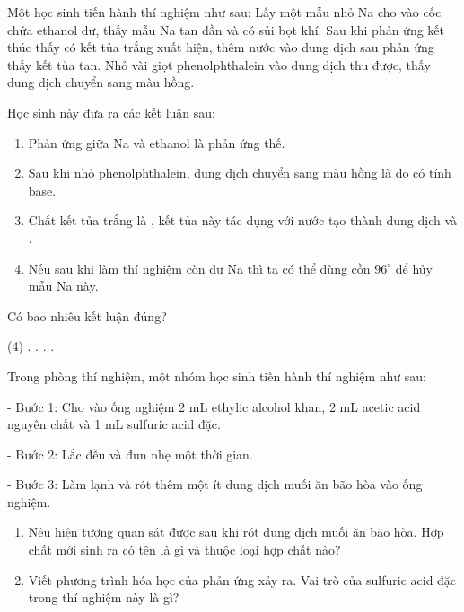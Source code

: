 \begin{tuluyen}
Một học sinh tiến hành thí nghiệm như sau: Lấy một mẫu nhỏ Na cho vào cốc chứa ethanol dư, thấy mẫu Na tan dần và có sủi bọt khí. Sau khi phản ứng kết thúc thấy có kết tủa trắng xuất hiện, thêm nước vào dung dịch sau phản ứng thấy kết tủa tan. Nhỏ vài giọt phenolphthalein vào dung dịch thu được, thấy dung dịch chuyển sang màu hồng.

Học sinh này đưa ra các kết luận sau:
\begin{enumerate}
\item Phản ứng giữa Na và ethanol là phản ứng thế.
\item Sau khi nhỏ phenolphthalein, dung dịch chuyển sang màu hồng là do  có tính base.
\item Chất kết tủa trắng là , kết tủa này tác dụng với nước tạo thành dung dịch  và .
\item Nếu sau khi làm thí nghiệm còn dư Na thì ta có thể dùng cồn $96^\circ$ để hủy mẫu Na này.
\end{enumerate}
Có bao nhiêu kết luận đúng?
\begin{tasks}(4)
.
.
.
.
\end{tasks}
\end{tuluyen}



\begin{tuluyen}
Trong phòng thí nghiệm, một nhóm học sinh tiến hành thí nghiệm như sau:

- Bước 1: Cho vào ống nghiệm 2 mL ethylic alcohol khan, 2 mL acetic acid nguyên chất và 1 mL sulfuric acid đặc.

- Bước 2: Lắc đều và đun nhẹ một thời gian.

- Bước 3: Làm lạnh và rót thêm một ít dung dịch muối ăn bão hòa vào ống nghiệm.

\begin{enumerate}
\item Nêu hiện tượng quan sát được sau khi rót dung dịch muối ăn bão hòa. Hợp chất mới sinh ra có tên là gì và thuộc loại hợp chất nào?
\item Viết phương trình hóa học của phản ứng xảy ra. Vai trò của sulfuric acid đặc trong thí nghiệm này là gì?
\end{enumerate}
\end{tuluyen}

